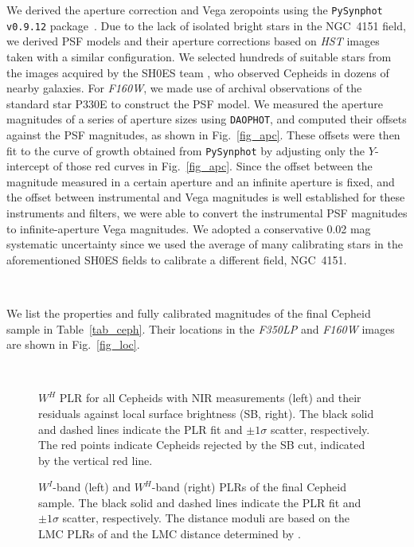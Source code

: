 \documentclass[twocolumn]{aastex63}
\renewcommand{\ng}{NGC\ 4151 }
\newcommand{\ngs}{NGC\ 4151}
\newcommand{\hst}{{\it HST} }
\newcommand{\hstw}{{\it F350LP} }
\newcommand{\hsth}{{\it F160W} }
\newcommand{\hsths}{{\it F160W}}
\begin{document}
We derived the aperture correction and Vega zeropoints using the {\tt PySynphot v0.9.12} package~\citep{2013ascl.soft03023S}. Due to the lack of isolated bright stars in the \ng field, we derived PSF models and their aperture corrections based on \hst images taken with a similar configuration. We selected hundreds of suitable stars from the images acquired by the SH0ES team \citep{Riess2016}, who observed Cepheids in dozens of nearby galaxies. For \hsths, we made use of archival observations of the standard star P330E to construct the PSF model. We measured the aperture magnitudes of a series of aperture sizes using {\tt DAOPHOT}, and computed their offsets against the PSF magnitudes, as shown in Fig.~\ref{fig_apc}. These offsets were then fit to the curve of growth obtained from {\tt PySynphot} by adjusting only the $Y$-intercept of those red curves in Fig.~\ref{fig_apc}. Since the offset between the magnitude measured in a certain aperture and an infinite aperture is fixed, and the offset between instrumental and Vega magnitudes is well established for these instruments and filters, we were able to convert the instrumental PSF magnitudes to infinite-aperture Vega magnitudes. We adopted a conservative 0.02 mag systematic uncertainty since we used the average of many calibrating stars in the aforementioned SH0ES fields to calibrate a different field, \ngs.

\ \par 

We list the properties and fully calibrated magnitudes of the final Cepheid sample in Table~\ref{tab_ceph}. Their locations in the \hstw and \hsth images are shown in Fig.~\ref{fig_loc}.

\ \par

\begin{figure*}
\caption{$W^H$ PLR for all Cepheids with NIR measurements (left) and their residuals against local surface brightness (SB, right). The black solid and dashed lines indicate the PLR fit and $\pm1\sigma$ scatter, respectively. The red points indicate Cepheids rejected by the SB cut, indicated by the vertical red line.\label{fig_sb}}
\end{figure*}

\begin{figure*}
\caption{$W^I$-band (left) and $W^H$-band (right) PLRs of the final Cepheid sample. The black solid and dashed lines indicate the PLR fit and $\pm1\sigma$ scatter, respectively. The distance moduli are based on the LMC PLRs of \citet{Riess2019} and the LMC distance determined by \citet{2019Natur.567..200P}. \label{fig_plr}}
\end{figure*}
\end{document}
